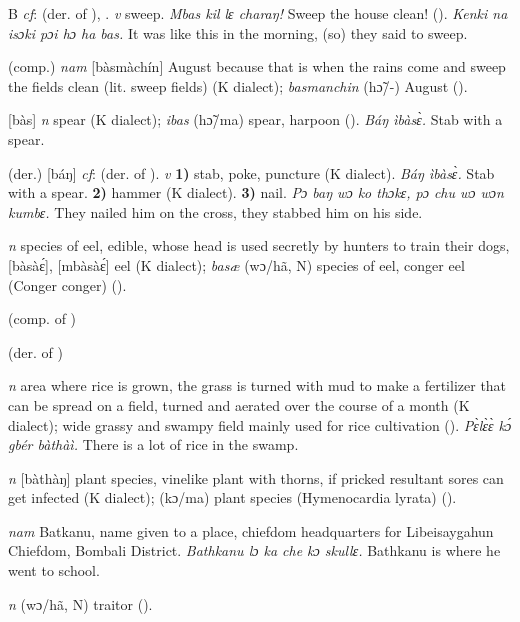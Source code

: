 \begin{letter}{B}
 \textit{cf}:  (der. of ), . \textit{v} sweep. \textit{Mbas kil lɛ charaŋ!} Sweep the house clean! (\citealt{Pichl1967}). \textit{ Kenki na isɔki pɔi hɔ ha bas.} It was like this in the morning, (so) they said to sweep. 

 (comp.) \textit{nam} [bàsmàchín] August because that is when the rains come and sweep the fields clean (lit. sweep fields) (K dialect); \textit{basmanchin} (hɔ̃/-) August (\citealt{Pichl1967}). 

 [bàs] \textit{n} spear (K dialect); \textit{ibas} (hɔ̃/ma) spear, harpoon (\citealt{Pichl1967}). \textit{Báŋ ìbàsɛ̀.} Stab with a spear.

 (der.) [báŋ] \textit{cf}:  (der. of ). \textit{v} \textbf{1)} stab, poke, puncture (K dialect). \textit{Báŋ ìbàsɛ̀.} Stab with a spear. \textbf{2)} hammer (K dialect). \textbf{3)} nail. \textit{Pɔ baŋ wɔ ko thɔkɛ, pɔ chu wɔ wɔn kumbɛ.} They nailed him on the cross, they stabbed him on his side. 

 \textit{n} species of eel, edible, whose head is used secretly by hunters to train their dogs, [bàsàɛ́], [mbàsàɛ́] eel (K dialect); \textit{basæ} (wɔ/hã, N) species of eel, conger eel (Conger conger) (\citealt{Pichl1967}). 

 (comp. of ) 

 (der. of ) 

 \textit{n} area where rice is grown, the grass is turned with mud to make a fertilizer that can be spread on a field, turned and aerated over the course of a month (K dialect); wide grassy and swampy field mainly used for rice cultivation (\citealt{Pichl1967}). \textit{Pɛ̀lɛ̀ɛ̀ kɔ́ gbér bàthàì.} There is a lot of rice in the swamp. 

 \textit{n} [bàthàŋ] plant species, vinelike plant with thorns, if pricked resultant sores can get infected (K dialect); (kɔ/ma) plant species (Hymenocardia lyrata) (\citealt{Pichl1967}). 

 \textit{nam} Batkanu, name given to a place, chiefdom headquarters for Libeisaygahun Chiefdom, Bombali District. \textit{Bathkanu lɔ ka che kɔ skullɛ.} Bathkanu is where he went to school.

 \textit{n} (wɔ/hã, N) traitor (\citealt{Pichl1967}).


\end{letter}
